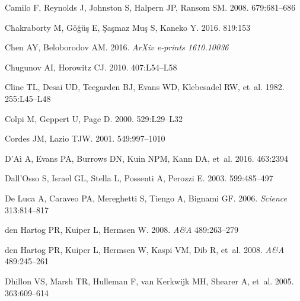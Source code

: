 \documentclass[letterpaper]{ar-1col}
\begin{document}
\begin{thebibliography}{}
{Camilo} F, {Reynolds} J, {Johnston} S, {Halpern} JP, {Ransom} SM. 2008.
\textit{\apj} 679:681--686

{Chakraborty} M, {G{\"o}{\u g}{\"u}{\c s}} E, {{\c S}a{\c s}maz Mu{\c s}} S,
  {Kaneko} Y. 2016.
\textit{\apj} 819:153

{Chen} AY, {Beloborodov} AM. 2016.
\textit{ArXiv e-prints 1610.10036}

{Chugunov} AI, {Horowitz} CJ. 2010.
\textit{\mnras} 407:L54--L58

{Cline} TL, {Desai} UD, {Teegarden} BJ, {Evans} WD, {Klebesadel} RW, et~al.
  1982.
\textit{\apj} 255:L45--L48

Colpi M, Geppert U, Page D. 2000.
\textit{\apj} 529:L29--L32

{Cordes} JM, {Lazio} TJW. 2001.
\textit{\apj} 549:997--1010

{D'A{\`i}} A, {Evans} PA, {Burrows} DN, {Kuin} NPM, {Kann} DA, et~al. 2016.
\textit{\mnras} 463:2394

Dall'Osso S, Israel GL, Stella L, Possenti A, Perozzi E. 2003.
\textit{\apj} 599:485--497

{De Luca} A, {Caraveo} PA, {Mereghetti} S, {Tiengo} A, {Bignami} GF. 2006.
\textit{Science} 313:814--817

den Hartog PR, Kuiper L, Hermsen W. 2008.
\textit{A\&A} 489:263--279

den Hartog PR, Kuiper L, Hermsen W, Kaspi VM, Dib R, et~al. 2008.
\textit{A\&A} 489:245--261

Dhillon VS, Marsh TR, Hulleman F, van Kerkwijk MH, Shearer A, et~al. 2005.
\textit{\mnras} 363:609--614


\end{thebibliography}
\end{document}
